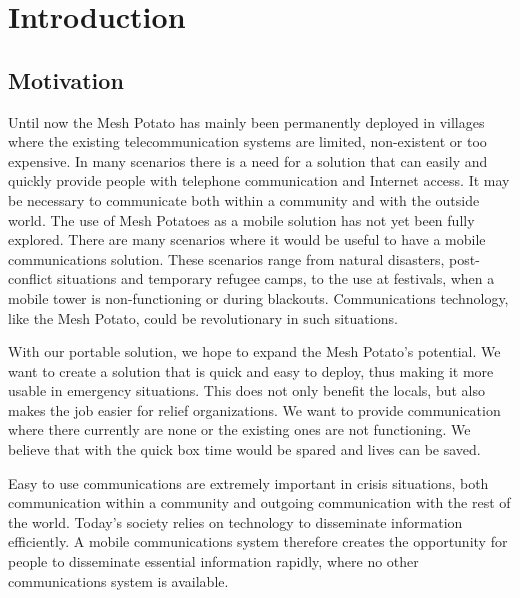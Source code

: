 \chapter{Introduction}
\label{chp:introduction} 

\section{Motivation}
Until now the Mesh Potato has mainly been permanently deployed in villages where the existing telecommunication systems are limited, non-existent or too expensive. In many scenarios there is a need for a solution that can easily and quickly provide people with telephone communication and Internet access. It may be necessary to communicate both within a community and with the outside world. The use of Mesh Potatoes as a mobile solution has not yet been fully explored. There are many scenarios where it would be useful to have a mobile communications solution. These scenarios range from natural disasters, post-conflict situations and temporary refugee camps, to the use at festivals, when a mobile tower is non-functioning or during blackouts. Communications technology, like the Mesh Potato, could be revolutionary in such situations. 

With our portable solution, we hope to expand the Mesh Potato's potential. We want to create a solution that is quick and easy to deploy, thus making it more usable in emergency situations. This does not only benefit the locals, but also makes the job easier for relief organizations. We want to provide communication where there currently are none or the existing ones are not functioning. We believe that with the \gls{quick} box time would be spared and lives can be saved. 

Easy to use communications are extremely important in crisis situations, both communication within a community and outgoing communication with the rest of the world. Today's society relies on technology to disseminate information efficiently. A mobile communications system therefore creates the opportunity for people to disseminate essential information rapidly, where no other communications system is available. 


